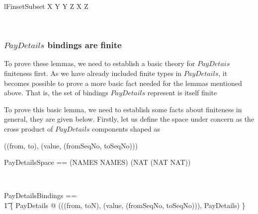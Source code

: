 \begin{LToolkit}
\begin{theorem}{lFinsetSubset}
  X \in \power Y \land Y \in \finset Z \implies X \in \finset Z
\end{theorem}~\end{LToolkit}

\subsubsection{$PayDetails$ bindings are finite}

To prove these lemmas, we need to establish a basic theory for $PayDetais$ finiteness first.
As we have already included finite types in $PayDetails$, it becomes possible to prove a more basic
fact needed for the lemmas mentioned above. That is, the set of bindings $PayDetails$ represent is itself finite
%
%
To prove this basic lemma, we need to establish some facts about finiteness in general, they are given below.
Firstly, let us define the space under concern as the cross product of $PayDetails$ components
shaped as
\begin{gzed}
((from, to), (value, (fromSeqNo, toSeqNo)))
\end{gzed}
%
\begin{LNewADef}
\begin{zed}
   PayDetailsSpace == (NAMES \cross NAMES) \cross (NAT \cross (NAT \cross NAT))
\end{zed}~\end{LNewADef}

\begin{LNewADef}
\begin{zed}
   PayDetailsBindings == \\
    \t1 \{ PayDetails @ (((from, toN), (value, (fromSeqNo, toSeqNo))), \theta PayDetails) \}
\end{zed}~\end{LNewADef}

\begin{LNewLemma}
~\end{LNewLemma}

